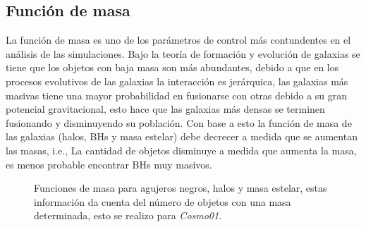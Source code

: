 \subsection{ Función de masa}
\label{subsec: funcion de masa}
La función de masa es uno de los parámetros de control más contundentes en el análisis de las simulaciones. Bajo la teoría de formación y evolución de galaxias se tiene que los objetos con baja masa son más abundantes, debido a que en los procesos evolutivos de las galaxias la interacción es jerárquica, las galaxias más masivas tiene una mayor probabilidad en fusionarse con otras debido a su gran potencial gravitacional, esto hace que las galaxias más densas se terminen fusionando y disminuyendo su población. Con base a esto la función de masa de las galaxias (halos, BHs y masa estelar) debe decrecer a medida que se aumentan las masas, i.e., La cantidad de objetos disminuye a medida que aumenta la masa, es menos probable encontrar BHs muy masivos. 
%
\begin{figure}[-h]
 \centering
 \caption{Funciones de masa para agujeros negros, halos y masa estelar, estas información da cuenta del número de objetos con una masa determinada, esto se realizo para {\it{Cosmo01}}. }
 \label{fig: Funciones de masa cosmo01}
\end{figure}
